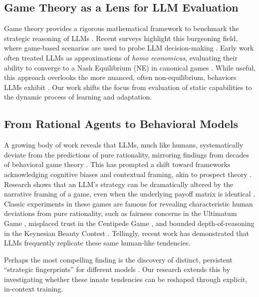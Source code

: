 \documentclass[11pt]{article}
\begin{document}
\subsection{Game Theory as a Lens for LLM Evaluation}
Game theory provides a rigorous mathematical framework to benchmark the strategic reasoning of LLMs \citep{fudenberg1991game, osborne2004introduction}. Recent surveys highlight this burgeoning field, where game-based scenarios are used to probe LLM decision-making \citep{sun2025survey, guo2024investigation}. Early work often treated LLMs as approximations of \textit{homo economicus}, evaluating their ability to converge to a Nash Equilibrium (NE) in canonical games \citep{nash1951non}. While useful, this approach overlooks the more nuanced, often non-equilibrium, behaviors LLMs exhibit \citep{jia2025evaluation}. Our work shifts the focus from evaluation of static capabilities to the dynamic process of learning and adaptation.

\subsection{From Rational Agents to Behavioral Models}
A growing body of work reveals that LLMs, much like humans, systematically deviate from the predictions of pure rationality, mirroring findings from decades of behavioral game theory \citep{camerer2003behavioral, pnas2024ai_behavioral_science}. This has prompted a shift toward frameworks acknowledging cognitive biases and contextual framing, akin to prospect theory \citep{kahneman1979prospect}. Research shows that an LLM's strategy can be dramatically altered by the narrative framing of a game, even when the underlying payoff matrix is identical \citep{montrealethics_framing, grigoryan2024prisoners}. 
Classic experiments in these games are famous for revealing characteristic human deviations from pure rationality, such as fairness concerns in the Ultimatum Game \citep{guth1982experimental}, misplaced trust in the Centipede Game \citep{mckelveypalfrey1992centipede}, and bounded depth-of-reasoning in the Keynesian Beauty Contest \citep{grossman1976information}. Tellingly, recent work has demonstrated that LLMs frequently replicate these same human-like tendencies.

Perhaps the most compelling finding is the discovery of distinct, persistent ``strategic fingerprints'' for different models \citep{payne2025fingerprints}. Our research extends this by investigating whether these innate tendencies can be reshaped through explicit, in-context training.
\end{document}
